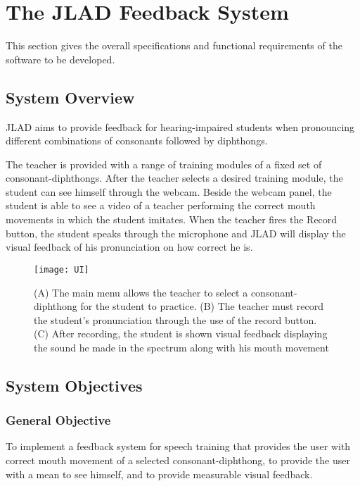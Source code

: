 %
%
%                 

\chapter{The JLAD Feedback System}
This section gives the overall specifications and functional requirements of the software to be developed.

\section{System Overview}
JLAD aims to provide feedback for hearing-impaired students when pronouncing different combinations of consonants followed by diphthongs.

The teacher is provided with a range of training modules of a fixed set of consonant-diphthongs.  After the teacher selects a desired training module, the student can see himself through the webcam. Beside the webcam panel, the student is able to see a video of a teacher performing the correct mouth movements in which the student imitates. When the teacher fires the Record button, the student speaks through the microphone and JLAD will display the visual feedback of his pronunciation on how correct he is.

\begin{figure}[!htbp]
    \centering
    \texttt{[image: UI]}
    \caption{(A) The main menu allows the teacher to select a consonant-diphthong for the student to practice. (B) The teacher must record the student's pronunciation through the use of the record button. (C) After recording, the student is shown visual feedback displaying the sound he made in the spectrum along with his mouth movement}
    \label{fig:proto-mainmenu}
\end{figure}


\pagebreak

\section{System Objectives}

\subsection{General Objective}
To implement a feedback system for speech training that provides the user with correct mouth movement of a selected consonant-diphthong, to provide the user with a mean to see himself, and to provide measurable visual feedback.

